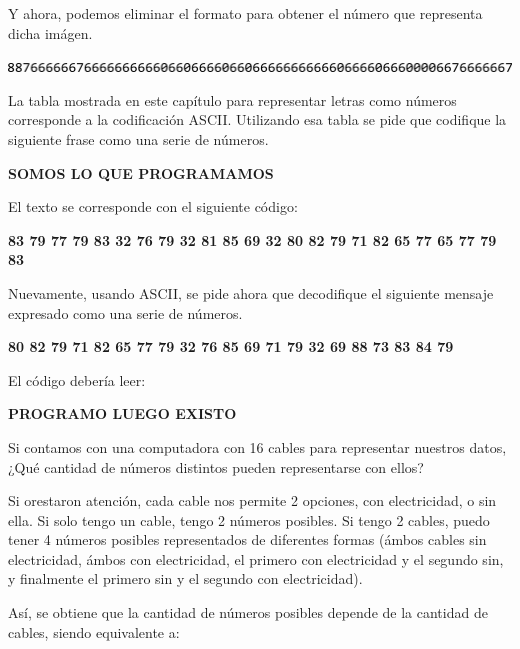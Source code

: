 Y ahora, podemos eliminar el formato para obtener el número que representa dicha imágen.

\vspace{0.3cm}
\centerline{\includegraphics[scale=0.65]{soluciones/2_informacion/1_bajo_nivel/imagenes/pixels_smile_code.png}}
\vspace{1cm}

\begin{exercise}
La tabla mostrada en este capítulo para representar letras como números
corresponde a la codificación ASCII. Utilizando esa tabla se pide que codifique
la siguiente frase como una serie de números.

\textbf{SOMOS LO QUE PROGRAMAMOS}
\end{exercise}

El texto se corresponde con el siguiente código:

\textbf{83 79 77 79 83 32 76 79 32 81 85 69 32 80 82 79 71 82 65 77 65 77 79 83}
\vspace{1cm}

\begin{exercise}
Nuevamente, usando ASCII, se pide ahora que decodifique el siguiente mensaje
expresado como una serie de números.

\textbf{80 82 79 71 82 65 77 79 32 76 85 69 71 79 32 69 88 73 83 84 79}
\vspace{1cm}

\end{exercise}

El código debería leer:

\textbf{PROGRAMO LUEGO EXISTO}
\vspace{1cm}

\begin{exercise}
Si contamos con una computadora con 16 cables para representar nuestros datos,
¿Qué cantidad de números distintos pueden representarse con ellos?
\end{exercise}

Si orestaron atención, cada cable nos permite 2 opciones, con electricidad, o
sin ella. Si solo tengo un cable, tengo 2 números posibles. Si tengo 2 cables,
puedo tener 4 números posibles representados de diferentes formas (ámbos cables
sin electricidad, ámbos con electricidad, el primero con electricidad y el
segundo sin, y finalmente el primero sin y el segundo con electricidad).

Así, se obtiene que la cantidad de números posibles depende de la cantidad de
cables, siendo equivalente a:

